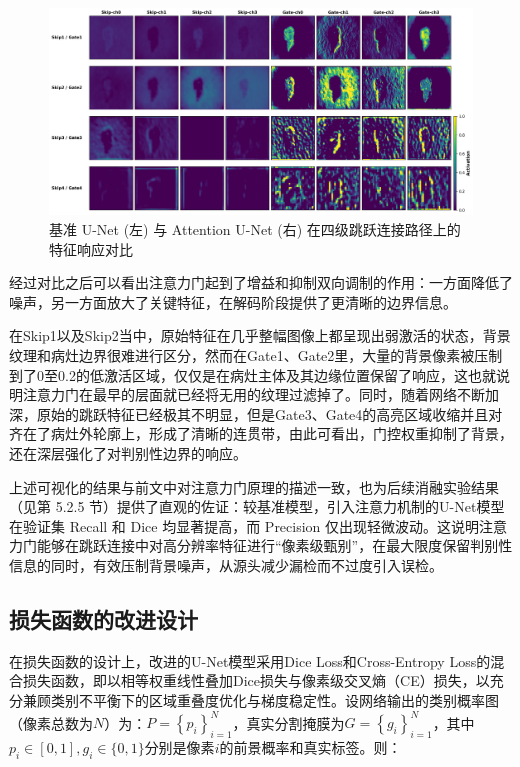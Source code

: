 \begin{figure}[!htbp]
    \centering
    \includegraphics[width=\textwidth]{fig/unet_vs_attunet_feature_compare.png}
    \caption{基准 U-Net (左) 与 Attention U-Net (右) 在四级跳跃连接路径上的特征响应对比}
    \label{fig:skip_vs_gate_vis}
\end{figure}

经过对比之后可以看出注意力门起到了增益和抑制双向调制的作用：一方面降低了噪声，另一方面放大了关键特征，在解码阶段提供了更清晰的边界信息。

在Skip1以及Skip2当中，原始特征在几乎整幅图像上都呈现出弱激活的状态，背景纹理和病灶边界很难进行区分，然而在Gate1、Gate2里，大量的背景像素被压制到了0至0.2的低激活区域，仅仅是在病灶主体及其边缘位置保留了响应，这也就说明注意力门在最早的层面就已经将无用的纹理过滤掉了。同时，随着网络不断加深，原始的跳跃特征已经极其不明显，但是Gate3、Gate4的高亮区域收缩并且对齐在了病灶外轮廓上，形成了清晰的连贯带，由此可看出，门控权重抑制了背景，还在深层强化了对判别性边界的响应。

上述可视化的结果与前文中对注意力门原理的描述一致，也为后续消融实验结果（见第 5.2.5 节）提供了直观的佐证：较基准模型，引入注意力机制的U-Net模型在验证集 Recall 和 Dice 均显著提高，而 Precision 仅出现轻微波动。这说明注意力门能够在跳跃连接中对高分辨率特征进行“像素级甄别”，在最大限度保留判别性信息的同时，有效压制背景噪声，从源头减少漏检而不过度引入误检。

\subsection{损失函数的改进设计}

在损失函数的设计上，改进的U-Net模型采用Dice Loss和Cross-Entropy Loss的混合损失函数，即以相等权重线性叠加Dice损失与像素级交叉熵（CE）损失，以充分兼顾类别不平衡下的区域重叠度优化与梯度稳定性。设网络输出的类别概率图（像素总数为$N$）为：$ P=\left\{p_{i}\right\}_{i=1}^{N} $，真实分割掩膜为$ G=\left\{g_{i}\right\}_{i=1}^{N} $，其中$ p_{i} \in[0,1], g_{i} \in\{0,1\}$分别是像素$i$的前景概率和真实标签。则：

